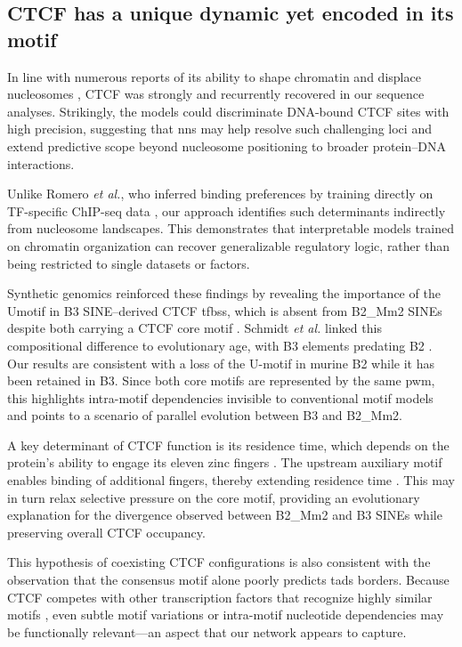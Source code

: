 \documentclass[11pt]{book}
\begin{document}
\subsection{CTCF has a unique dynamic yet encoded in its motif}
In line with numerous reports of its ability to shape chromatin and displace nucleosomes \cite{teif_nucleosome_2014,nichols_ctcf_2015,ghirlando_ctcf_2016, clarkson_ctcf-dependent_2019, festuccia_transcription_2019}, CTCF was strongly and recurrently recovered in our sequence analyses. Strikingly, the models could discriminate DNA-bound CTCF sites with high precision, suggesting that \glspl{nn} may help resolve such challenging loci and extend predictive scope beyond nucleosome positioning to broader protein–DNA interactions.

Unlike Romero \textit{et al.}, who inferred binding preferences by training directly on TF-specific ChIP-seq data \cite{romero_tfscope_2024}, our approach identifies such determinants indirectly from nucleosome landscapes. This demonstrates that interpretable models trained on chromatin organization can recover generalizable regulatory logic, rather than being restricted to single datasets or factors.

Synthetic genomics reinforced these findings by revealing the importance of the U\-motif in B3 SINE–derived CTCF \glspl{tfbs}, which is absent from B2\_Mm2 SINEs despite both carrying a CTCF core motif \cite{schmidt_waves_2012}. Schmidt \textit{et al.} linked this compositional difference to evolutionary age, with B3 elements predating B2 \cite{schmidt_waves_2012, vassetzky_analysis_2021}. Our results are consistent with a loss of the U-motif in murine B2 while it has been retained in B3. Since both core motifs are represented by the same \gls{pwm}, this highlights intra-motif dependencies invisible to conventional motif models and points to a scenario of parallel evolution between B3 and B2\_Mm2.

A key determinant of CTCF function is its residence time, which depends on the protein’s ability to engage its eleven zinc fingers \cite{soochit_ctcf_2021}. The upstream auxiliary motif enables binding of additional fingers, thereby extending residence time \cite{yang_structures_2023}. This may in turn relax selective pressure on the core motif, providing an evolutionary explanation for the divergence observed between B2\_Mm2 and B3 SINEs while preserving overall CTCF occupancy.

This hypothesis of coexisting CTCF configurations is also consistent with the observation that the consensus motif alone poorly predicts \glspl{tad} borders. Because CTCF competes with other transcription factors that recognize highly similar motifs \cite{kaaij_chahp_2019, wang_adnp_2024}, even subtle motif variations or intra-motif nucleotide dependencies may be functionally relevant—an aspect that our network appears to capture.
\end{document}
